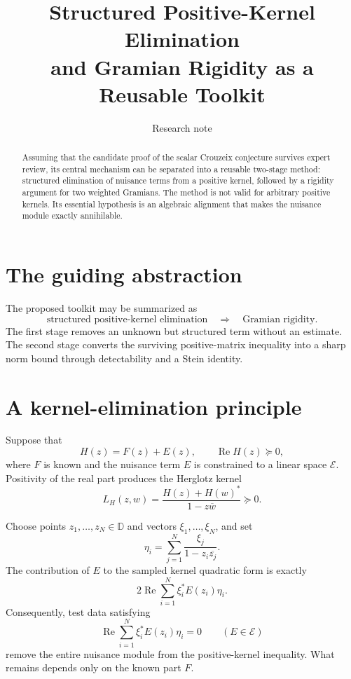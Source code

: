 \documentclass[11pt]{article}
\title{Structured Positive-Kernel Elimination\\
and Gramian Rigidity as a Reusable Toolkit}
\author{Research note}
\date{}
\newcommand{\D}{\mathbb D}
\newcommand{\RePart}{\operatorname{Re}}
\begin{document}
\maketitle

\begin{abstract}
Assuming that the candidate proof of the scalar Crouzeix conjecture
survives expert review, its central mechanism can be separated into a
reusable two-stage method: structured elimination of nuisance terms
from a positive kernel, followed by a rigidity argument for two
weighted Gramians.  The method is not valid for arbitrary positive
kernels.  Its essential hypothesis is an algebraic alignment that
makes the nuisance module exactly annihilable.
\end{abstract}

\section{The guiding abstraction}

The proposed toolkit may be summarized as
\begin{equation}
 \boxed{\text{structured positive-kernel elimination}
 \quad\Longrightarrow\quad
 \text{Gramian rigidity}.}
 \label{eq:guiding-abstraction}
\end{equation}
The first stage removes an unknown but structured term without an
estimate.  The second stage converts the surviving positive-matrix
inequality into a sharp norm bound through detectability and a Stein
identity.

\section{A kernel-elimination principle}

Suppose that
\begin{equation}
 H(z)=F(z)+E(z),
 \qquad \RePart H(z)\succeq0,
 \label{eq:H-splitting}
\end{equation}
where $F$ is known and the nuisance term $E$ is constrained to a
linear space \(\mathcal E\).  Positivity of the real part produces the
Herglotz kernel
\begin{equation}
 L_H(z,w)=\frac{H(z)+H(w)^*}{1-z\overline w}\succeq0.
 \label{eq:Herglotz-kernel}
\end{equation}

Choose points $z_1,\ldots,z_N\in\D$ and vectors
\(\xi_1,\ldots,\xi_N\), and set
\begin{equation}
 \eta_i=\sum_{j=1}^N
 \frac{\xi_j}{1-z_i\overline{z_j}}.
 \label{eq:eta-definition}
\end{equation}
The contribution of $E$ to the sampled kernel quadratic form is
exactly
\begin{equation}
 2\RePart\sum_{i=1}^N \xi_i^*E(z_i)\eta_i.
 \label{eq:nuisance-contribution}
\end{equation}
Consequently, test data satisfying
\begin{equation}
 \RePart\sum_{i=1}^N \xi_i^*E(z_i)\eta_i=0
 \qquad(E\in\mathcal E)
 \label{eq:annihilator-condition}
\end{equation}
remove the entire nuisance module from the positive-kernel
inequality.  What remains depends only on the known part $F$.
\end{document}
